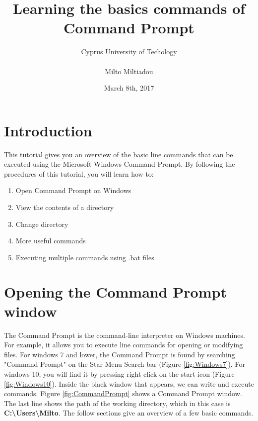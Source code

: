 \documentclass{article}
\title{ \textbf{Learning the basics commands of \\ Command Prompt}}
\author{Cyprus University of Techology \\ \\ Milto Miltiadou}
\date{March 8th, 2017}
\begin{document}
	\setlength{\parindent}{0cm}
		\maketitle
			\setcounter{secnumdepth}{0}
		\section{Introduction}
		
	\par This tutorial gives you an overview of the basic line commands that can be executed using the Microsoft Windows  Command Prompt. By following the procedures of this tutorial, you will learn how to: 
	
	\begin{enumerate}
		\item Open Command Prompt on Windows
		\item View the contents of a directory 
		\item Change directory
		\item More useful commands
		\item Executing multiple commands using .bat files 
	\end{enumerate}
			\setcounter{secnumdepth}{3}
			
	\section{Opening the Command Prompt window}
	 
	 \par The Command Prompt is the command-line interpreter on Windows machines. For example, it allows you to execute line commands for opening or modifying files. For windows 7 and lower, the Command Prompt is found by searching "Command Prompt" on the Star Menu Search bar (Figure \ref{fig:Windows7}). For windows 10, you will find it by pressing right click on the start icon (Figure \ref{fig:Windows10}). Inside the black window that appears, we can write and execute  commands. Figure \ref{fig:CommandPrompt} shows a Command Prompt window. The last line shows the path of the working directory, which in this case is \textbf{C:\textbackslash Users\textbackslash Milto}.  The follow sections give an overview of a few basic commands. 
	 
\end{document}
